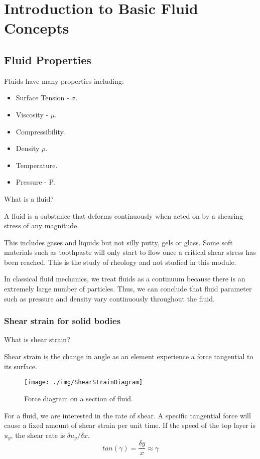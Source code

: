 \chapter{Introduction to Basic Fluid Concepts}
\section{Fluid Properties}
Fluids have many properties including:
\begin{itemize}[noitemsep]
  \item Surface Tension - \( \sigma \).
  \item Viscosity - \( \mu \).
  \item Compressibility.
  \item Density \( \rho \).
  \item Temperature.
  \item Pressure - P.
\end{itemize}
What is a fluid?
\begin{center}
  A fluid is a substance that deforms continuously when acted on by a shearing stress of any magnitude.
\end{center}
This includes gases and liquids but not silly putty, gels or glass. Some soft materials such as toothpaste will only start to flow once a critical shear stress has been reached. This is the study of rheology and not studied in this module.

In classical fluid mechanics, we treat fluids as a continuum because there is an extremely large number of particles. Thus, we can conclude that fluid parameter such as pressure and density vary continuously throughout the fluid.
\subsection{Shear strain for solid bodies}
What is shear strain?
\begin{center}
  Shear strain is the change in angle as an element experience a force tangential to its surface.
\end{center}
\begin{figure}[h!]
  \centering
  \texttt{[image: ./img/ShearStrainDiagram]}
  \caption{Force diagram on a section of fluid.}
\end{figure}
For a fluid, we are interested in the rate of shear. A specific tangential force will cause a fixed amount of shear strain per unit time. If the speed of the top layer is \( u_y\), the shear rate is \(\delta u_y / \delta x\).
\begin{equation}
  tan(\gamma) = \frac{\delta y}{x} \approx \gamma
\end{equation}
